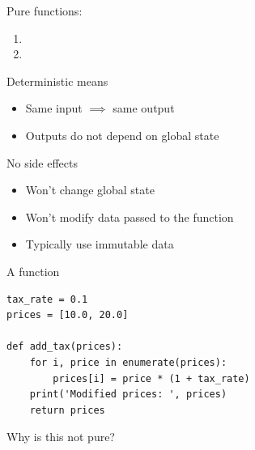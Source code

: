 \begin{frame}
    
    Pure functions:

    \begin{enumerate}
        \item {}
        \vspace{0.5em}
        \item {}
    \end{enumerate}


    Deterministic means

    \begin{itemize}
        \item Same input $\implies$ same output 
        \vspace{0.5em}
        \item Outputs do not depend on global state
    \end{itemize}


    No side effects

    \begin{itemize}
        \item Won't change global state
        \vspace{0.5em}
        \item Won't modify data passed to the function
        \vspace{0.5em}
        \item Typically use immutable data
    \end{itemize}

\end{frame}


\begin{frame}[fragile]

    A  function
    \vspace{0.5em}
    \vspace{0.5em}

    \begin{verbatim}
tax_rate = 0.1 
prices = [10.0, 20.0] 

def add_tax(prices):
    for i, price in enumerate(prices):
        prices[i] = price * (1 + tax_rate)    
    print('Modified prices: ', prices)
    return prices
    \end{verbatim}

    \vspace{0.5em}
    \vspace{0.5em}
    \vspace{0.5em}
    Why is this not pure?
    
\end{frame}



